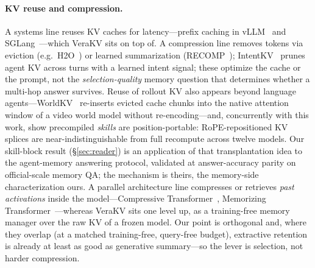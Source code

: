 \documentclass{article} %
\newcommand{\kvm}{VeraKV}
\begin{document}
\paragraph{KV reuse and compression.}
A systems line reuses KV caches for latency---prefix caching in
vLLM~\citep{vllm} and SGLang~\citep{sglang}---which \kvm{} sits on top of. A
compression line removes tokens via eviction (e.g.\ H2O~\citep{h2o}) or learned
summarization (RECOMP~\citep{recomp}); IntentKV~\citep{intentkv} prunes agent
KV across turns with a learned intent signal; these optimize the cache or the
prompt, not the \emph{selection-quality} memory question that determines whether a
multi-hop answer survives. Reuse of rollout KV also appears beyond language
agents---WorldKV~\citep{worldkv} re-inserts evicted cache chunks into the native
attention window of a video world model without re-encoding---and, concurrently
with this work, \citet{kvnotes} show precompiled \emph{skills} are
position-portable: RoPE-repositioned KV splices are near-indistinguishable from
full recompute across twelve models. Our skill-block result (\S\ref{sec:reader})
is an application of that transplantation idea to the agent-memory answering
protocol, validated at answer-accuracy parity on official-scale memory QA; the
mechanism is theirs, the memory-side characterization ours. A parallel architecture line compresses or retrieves
\emph{past activations} inside the model---Compressive
Transformer~\citep{compressivetransformer}, Memorizing
Transformer~\citep{memorizingtransformer}---whereas \kvm{} sits one level up, as a
training-free memory manager over the raw KV of a frozen model. Our point is
orthogonal and, where they overlap (at a
matched training-free, query-free budget), extractive retention is already at
least as good as generative summary---so the lever is selection, not harder
compression.
\end{document}
